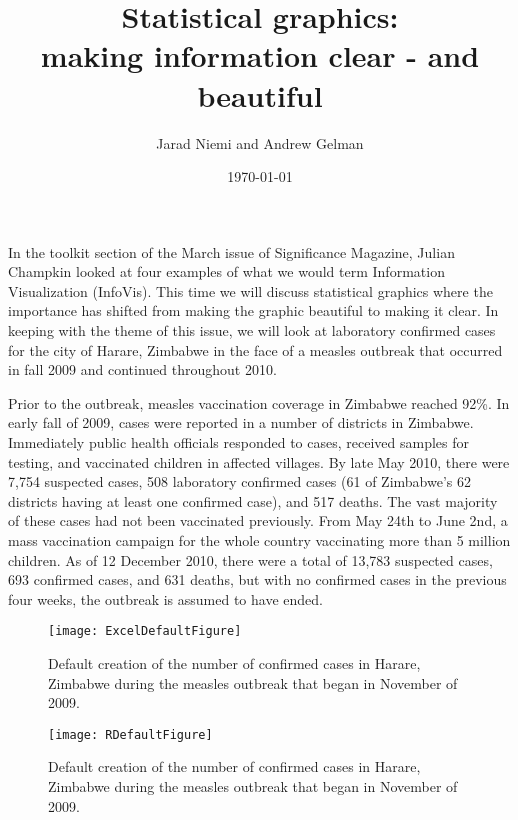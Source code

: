 \documentclass{article}
\title{Statistical graphics:\\making information clear - and beautiful}
\author{Jarad Niemi and Andrew Gelman}
\date{\today}
\begin{document}
\maketitle

In the toolkit section of the March issue of Significance Magazine, Julian Champkin looked at four examples of what we would term Information Visualization (InfoVis). This time we will discuss statistical graphics where the importance has shifted from making the graphic beautiful to making it clear. In keeping with the theme of this issue, we will look at laboratory confirmed cases for the city of Harare, Zimbabwe in the face of a measles outbreak that occurred in fall 2009 and continued throughout 2010. 

Prior to the outbreak, measles vaccination coverage in Zimbabwe reached 92\%. In early fall of 2009, cases were reported in a number of districts in Zimbabwe. Immediately public health officials responded to cases, received samples for testing, and vaccinated children in affected villages. By late May 2010, there were 7,754 suspected cases, 508 laboratory confirmed cases (61 of Zimbabwe's 62 districts having at least one confirmed case), and 517 deaths. The vast majority of these cases had not been vaccinated previously. From May 24th to June 2nd, a mass vaccination campaign for the whole country vaccinating more than 5 million children. As of 12 December 2010, there were a total of 13,783 suspected cases, 693 confirmed cases, and 631 deaths, but with no confirmed cases in the previous four weeks, the outbreak is assumed to have ended.

\begin{figure}[ht]
\centering
\texttt{[image: ExcelDefaultFigure]}
\caption{Default creation of the number of confirmed cases in Harare, Zimbabwe during the measles outbreak that began in November of 2009.}
\label{fig:ExcelDefaultFigure}
\end{figure}

\begin{figure}[ht]
\centering
\texttt{[image: RDefaultFigure]}
\caption{Default creation of the number of confirmed cases in Harare, Zimbabwe during the measles outbreak that began in November of 2009.}
\label{fig:RDefaultFigure}
\end{figure}
\end{document}
